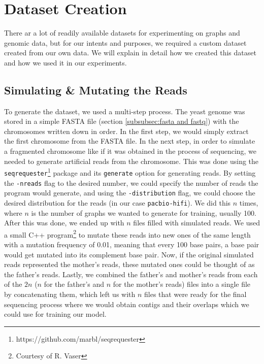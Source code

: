 \documentclass[times, utf8, diplomski, english]{fer_eng}
\begin{document}
\section{Dataset Creation}
\label{sec:dataset creation}

There ar a lot of readily available datasets for experimenting on graphs and genomic data, but for our intents and purposes, we required a custom dataset created from our own data. We will explain in detail how we created this dataset and how we used it in our experiments.

\subsection{Simulating \& Mutating the Reads}

To generate the dataset, we used a multi-step process. The yeast genome was stored in a simple FASTA file (section \ref{subsubsec:fasta and fastq}) with the chromosomes written down in order. In the first step, we would simply extract the first chromosome from the FASTA file. In the next step, in order to simulate a fragmented chromosome like if it was obtained in the process of sequencing, we needed to generate artificial reads from the chromosome. This was done using the \texttt{seqrequester}\footnote{https://github.com/marbl/seqrequester} package and its \texttt{generate} option for generating reads. By setting the \texttt{-nreads} flag to the desired number, we could specify the number of reads the program would generate, and using the \texttt{-distribution} flag, we could choose the desired distribution for the reads (in our case \texttt{pacbio-hifi}). We did this $n$ times, where $n$ is the number of graphs we wanted to generate for training, usually 100. After this was done, we ended up with $n$ files filled with simulated reads. We used a small C++ program\footnote{Courtesy of R. Vaser} to mutate these reads into new ones of the same length with a mutation frequency of 0.01, meaning that every 100 base pairs, a base pair would get mutated into its complement base pair. Now, if the original simulated reads represented the mother's reads, these mutated ones could be thought of as the father's reads. Lastly, we combined the father's and mother's reads from each of the $2n$ ($n$ for the father's and $n$ for the mother's reads) files into a single file by concatenating them, which left us with $n$ files that were ready for the final sequencing process where we would obtain contigs and their overlaps which we could use for training our model.
\end{document}

